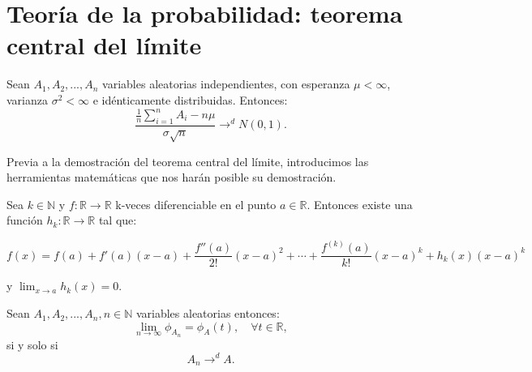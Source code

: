 \documentclass[../proyecto.tex]{memoir}
\begin{document}
\section{Teoría de la probabilidad: teorema central del límite}

\begin{teorema} \label{central}
Sean $A_{1},A_{2},...,A_{n}$ variables aleatorias independientes, con esperanza $\mu < \infty$, varianza $\sigma^2 < \infty$ e idénticamente distribuidas. Entonces: $$
\frac{ \frac{1}{n}\sum_{i=1}^nA_i - n\mu}{ \sigma \sqrt{n}} \to^d N(0,1).
$$
\end{teorema}

Previa a la demostración del teorema central del límite, introducimos las herramientas matemáticas que nos harán posible su demostración.

\begin{teorema}

Sea $k \in \mathds{N}$ y $f: \mathds{R} \to \mathds{R}$ k-veces diferenciable en el punto $a \in \mathds{R}$. Entonces existe una función $h_k: \mathds{R} \to \mathds{R}$ tal que:

$$
f(x)=f(a)+f'(a)(x-a)+\frac{f''(a)}{2!}(x-a)^2+\dotsb+\frac{f^{(k)}(a)}{k!}(x-a)^k + h_k(x)(x-a)^k
$$

y $\lim_{x\to a} h_k(x) = 0$.
\end{teorema}

\begin{teorema} \label{cont}
Sean $A_1, A_2,...,A_n, n\in\mathds{N}$ variables aleatorias entonces: $$
\lim_{n \to \infty }{\phi_{A_n}} = \phi_{A}(t), \quad \forall t\in \mathds{R},
$$
si y solo si $$
A_n \to^d A.
$$

\end{teorema}
\end{document}
